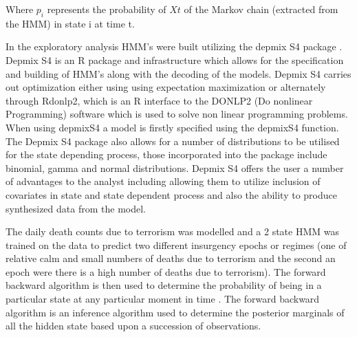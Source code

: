 Where $p_i$ represents the probability of $Xt$ of the Markov chain (extracted from the HMM) in state i at time t.

In the exploratory analysis HMM's were built utilizing the depmix S4 package \citep{visser2012package}. Depmix S4  is an R package and infrastructure which allows for the specification and building of HMM's along with the decoding of the models. Depmix S4 carries out optimization either using using expectation maximization or alternately through Rdonlp2, which is an R interface to the DONLP2 (Do nonlinear Programming) \citep{spelluccidonlp} software which is used to solve non linear programming problems. When using depmixS4 a model is firstly specified using the depmixS4 function. The Depmix S4 package also allows for a number of distributions to be utilised for the state depending process, those incorporated into the package include binomial, gamma and normal distributions. Depmix S4 offers the user a number of advantages to the analyst including allowing them to utilize inclusion of covariates in state and state dependent process and also the ability to produce synthesized data from the model.

The daily death counts due to terrorism was modelled and a 2 state HMM was trained on the data to predict two different insurgency epochs or regimes (one of relative calm and small numbers of deaths due to terrorism and the second an epoch were there is a high number of deaths due to terrorism). The forward backward algorithm is then used to determine the probability of being in a particular state at any particular moment in time \citep{austin1991forward}. The forward backward algorithm  is an inference algorithm used to determine the posterior marginals of all the hidden state based upon a succession of observations. 

